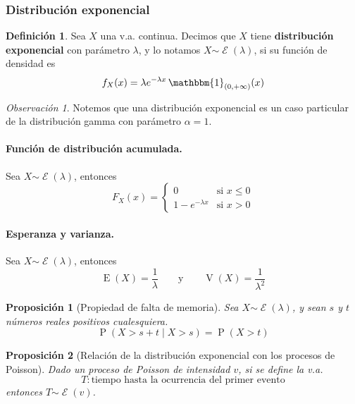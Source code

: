 \documentclass[11pt]{article}
\theoremstyle{plain}
\newtheorem*{pro}{Proposición}
\theoremstyle{definition}
\newtheorem*{defi}{Definición}
\theoremstyle{remark}
\newtheorem*{obs}{Observación}
\newcommand{\deft}[1]{\textbf{#1}}  %
\newcommand{\proba}{\ensuremath{\operatorname{P}}}  %
\newcommand{\esp}[0]{\ensuremath{\operatorname{E}}}  %
\newcommand{\var}[0]{\ensuremath{\operatorname{V}}}  %
\newcommand{\indi}[1]{\ensuremath{\mathbbm{1}_{#1}}}  %
\newcommand{\dist}[1]{\ensuremath{\sim \operatorname{#1}}}  %
\newcommand{\exponen}[0]{\ensuremath{\mathcal{E}}}  %
\begin{document}
    \subsubsection{Distribución exponencial}

      \begin{defi}
        Sea $X$ una v.a. continua. Decimos que $X$ tiene \deft{distribución exponencial} con parámetro $\lambda$, y lo notamos $X \dist{\exponen}(\lambda)$, si su función de densidad es
        \[ f_X(x) = \lambda e^{-\lambda x} \, \indi{(0,+\infty)}(x) \]
      \end{defi}
        
      \begin{obs}
        Notemos que una distribución exponencial es un caso particular de la distribución gamma con parámetro $\alpha = 1$.
      \end{obs}

      \paragraph{Función de distribución acumulada.}
      Sea $X \dist{\exponen}(\lambda)$, entonces
      \[ F_X(x) = \begin{cases}
        0 & \text{si $x \leq 0$} \\
        1 - e^{-\lambda x} & \text{si $x > 0$}
      \end{cases} \]

      \paragraph{Esperanza y varianza.}
      Sea $X \dist{\exponen}(\lambda)$, entonces
      \[ \esp(X) = \frac{1}{\lambda} \qquad \text{y} \qquad \var(X) = \frac{1}{\lambda^2} \]

      \begin{pro} [Propiedad de falta de memoria]
        Sea $X \dist{\exponen}(\lambda)$, y sean $s$ y $t$ números reales positivos cualesquiera.
        \[ \proba(X > s + t \mid X > s) = \proba(X > t) \]
      \end{pro}

      \begin{pro} [Relación de la distribución exponencial con los procesos de Poisson]
        Dado un proceso de Poisson de intensidad $v$, si se define la v.a.
        \[ T : \text{tiempo hasta la ocurrencia del primer evento} \]
        entonces $T \dist{\exponen}(v)$.
      \end{pro}
\end{document}
